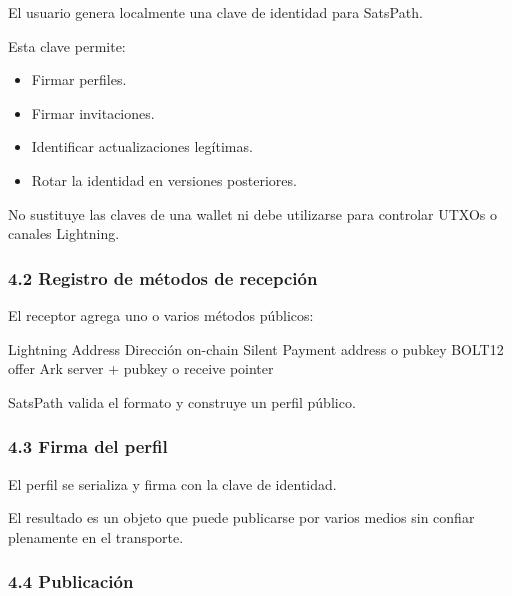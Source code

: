 \documentclass[
]{article}
\newenvironment{Shaded}{}{}
\newcommand{\NormalTok}[1]{#1}
\providecommand{\tightlist}{%
  \setlength{\itemsep}{0pt}\setlength{\parskip}{0pt}}
\begin{document}
El usuario genera localmente una clave de identidad para SatsPath.

Esta clave permite:

\begin{itemize}
\tightlist
\item
  Firmar perfiles.
\item
  Firmar invitaciones.
\item
  Identificar actualizaciones legítimas.
\item
  Rotar la identidad en versiones posteriores.
\end{itemize}

No sustituye las claves de una wallet ni debe utilizarse para controlar
UTXOs o canales Lightning.

\hypertarget{registro-de-muxe9todos-de-recepciuxf3n}{%
\subsubsection{4.2 Registro de métodos de
recepción}\label{registro-de-muxe9todos-de-recepciuxf3n}}

El receptor agrega uno o varios métodos públicos:

\begin{Shaded}
\begin{Highlighting}[]
\NormalTok{Lightning Address}
\NormalTok{Dirección on{-}chain}
\NormalTok{Silent Payment address o pubkey}
\NormalTok{BOLT12 offer}
\NormalTok{Ark server + pubkey o receive pointer}
\end{Highlighting}
\end{Shaded}

SatsPath valida el formato y construye un perfil público.

\hypertarget{firma-del-perfil}{%
\subsubsection{4.3 Firma del perfil}\label{firma-del-perfil}}

El perfil se serializa y firma con la clave de identidad.

El resultado es un objeto que puede publicarse por varios medios sin
confiar plenamente en el transporte.

\hypertarget{publicaciuxf3n}{%
\subsubsection{4.4 Publicación}\label{publicaciuxf3n}}
\end{document}
